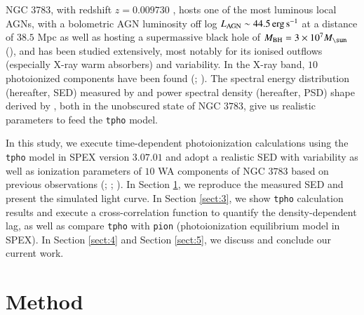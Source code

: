 \documentclass{aa}
\begin{document}
NGC 3783, with redshift $z=0.009730$ \citep{Theureau1998A&AS}, hosts one of the most luminous local AGNs, with a bolometric AGN luminosity off log $L_{\rm AGN} \sim  44.5 \, \rm erg \, \rm s^{-1}$ at a distance of $38.5$ Mpc \citep{Davies2015ApJ} as well as hosting a supermassive black hole of $M_{\rm BH} = 3 \times 10^7 M_{\sun}$ (\citealp{Vestergaard2006ApJ}), and has been studied extensively, most notably for its ionised outflows (especially X-ray warm absorbers) and variability. 
In the X-ray band, $10$ photoionized components have been found (\citealp{Mehdipour2017A&A}; \citealp{Mao2019A&A}).
The spectral energy distribution (hereafter, SED) measured by \cite{Mehdipour2017A&A} and power spectral density (hereafter, PSD) shape derived by \cite{Markowitz2005ApJ}, both in the unobscured state of NGC $3783$, give us realistic parameters to feed the \texttt{tpho} model. 



In this study, we execute time-dependent photoionization calculations using the \texttt{tpho} model \citep{Rogantini2022ApJ} in SPEX version $3.07.01$ \citep{kaastra2022} and adopt a realistic SED with variability as well as ionization parameters of $10$ WA components of NGC $3783$ based on previous observations (\citealp{Markowitz2005ApJ};  \citealp{Mehdipour2017A&A}; \citealp{Mao2019A&A}).
In Section \ref{sect:2}, we reproduce the measured SED and present the simulated light curve.
In Section \ref{sect:3}, we show \texttt{tpho} calculation results and execute a cross-correlation function to quantify the density-dependent lag, as well as compare \texttt{tpho} with \texttt{pion} (photoionization equilibrium model in SPEX).
In Section \ref{sect:4} and Section \ref{sect:5}, we discuss and conclude our current work.






\section{Method}\label{sect:2}
\end{document}
